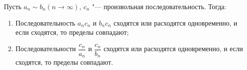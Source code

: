
    Пусть $a_n\sim b_n (n\to \infty)$, $c_n$ "--- произвольная последовательность. Тогда:

    \begin{enumerate}
        \item Последовательность $a_nc_n$ и $b_nc_n$ сходятся или расходятся одновременно, и если сходятся, то пределы совпадают;

        \item Последовательности $\dfrac{c_n}{a_n}$ и $\dfrac{c_n}{b_n}$ сходятся или расходятся одновременно, и если сходятся, то пределы совпадают.
    \end{enumerate}
